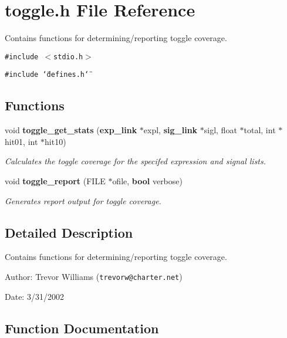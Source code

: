\section{toggle.h File Reference}
\label{toggle_8h}
Contains functions for determining/reporting toggle coverage.  


{\tt \#include $<$stdio.h$>$}\par
{\tt \#include \char`\"{}defines.h\char`\"{}}\par
\subsection*{Functions}
\begin{CompactItemize}
\item 
void {\bf toggle\_\-get\_\-stats} ({\bf exp\_\-link} $\ast$expl, {\bf sig\_\-link} $\ast$sigl, float $\ast$total, int $\ast$hit01, int $\ast$hit10)
\begin{CompactList}\small\item\em Calculates the toggle coverage for the specifed expression and signal lists. \item\end{CompactList}\item 
void {\bf toggle\_\-report} (FILE $\ast$ofile, {\bf bool} verbose)
\begin{CompactList}\small\item\em Generates report output for toggle coverage. \item\end{CompactList}\end{CompactItemize}


\subsection{Detailed Description}
Contains functions for determining/reporting toggle coverage. 

\begin{Desc}
\item[Author:]Trevor Williams ({\tt trevorw@charter.net}) \end{Desc}
\begin{Desc}
\item[Date:]3/31/2002 \end{Desc}


\subsection{Function Documentation}
